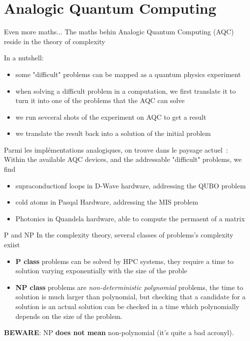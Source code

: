 \section{Analogic Quantum Computing}

\begin{frame}{Even more maths...}
The maths behin Analogic Quantum Computing (AQC) reside in the theory of complexity\newline

In a nutshell:
\begin{itemize}
    \item some "difficult" problems can be mapped as a quantum physics experiment
    \item when solving a difficult problem in a computation, we first translate it to turn it into
    one of the problems that the AQC can solve
    \item we run sevceral shots of the experiment on AQC to get a result
    \item we translate the result back into a solution of the initial problem
\end{itemize} 


Parmi les implémentations analogiques, on trouve dans le paysage actuel~:
Within the available AQC devices, and the addressable "difficult" problems, we find
\begin{itemize}
    \item supraconductionf loops in D-Wave hardware, addressing the QUBO problem
    \item cold atoms in Pasqal Hardware, addressing the MIS problem
    \item Photonics in Quandela hardware, able to compute the permaent of a matrix
\end{itemize}
\end{frame}

\begin{frame}{P and NP}
In the complexity theory, several classes of problems's complexity exiist
\begin{itemize}
    \item \textbf{P class} problems can be solved by HPC systems, they require a time to solution  varying exponentially
    with the size of the proble
    \item \textbf{NP class} problems are \textit{non-deterministic polynomial} problems, the time to solution is much 
    larger than polynomial, but checking that a candidate for a solution is an actual solution can be checked in a time
    which polynomially depends on the size of the problem. 
\end{itemize}


\textbf{BEWARE}: NP \textbf{does not mean} non-polynomial (it's quite a bad acronyl).
\end{frame}

